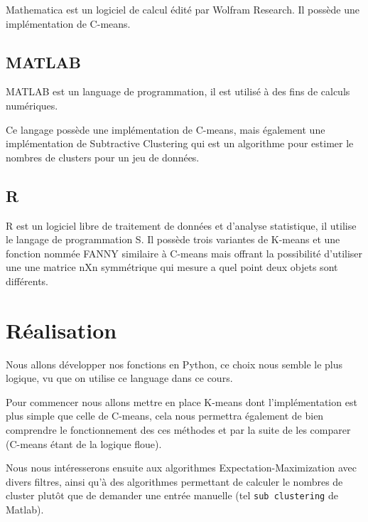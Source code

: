 \documentclass{article}
\begin{document}
  Mathematica est un logiciel de calcul édité par Wolfram Research. Il possède une implémentation de C-means.

  \subsection{MATLAB}

  MATLAB est un language de programmation, il est utilisé à des fins de calculs numériques.

  Ce langage possède une implémentation de C-means,
  mais également une implémentation de Subtractive Clustering
  qui est un algorithme pour estimer le nombres de clusters pour un jeu de données.


  \subsection{R}

  R est un logiciel libre de traitement de données et d'analyse statistique, il utilise le langage de programmation S.
  Il possède trois variantes de K-means et une fonction nommée FANNY similaire à C-means mais offrant la possibilité d'utiliser une
  une matrice nXn symmétrique qui mesure a quel point deux objets sont différents.


  \section{Réalisation}

  Nous allons développer nos fonctions en Python, ce choix nous semble le plus logique, vu que on utilise ce language dans ce cours.

  Pour commencer nous allons mettre en place K-means dont l'implémentation est plus simple que celle de C-means,
  cela nous permettra également de bien comprendre le fonctionnement des ces méthodes et par la suite de les comparer (C-means étant de la logique floue).

  Nous nous intéresserons ensuite aux algorithmes Expectation-Maximization avec divers filtres, ainsi qu'à des algorithmes permettant de calculer le nombres de cluster plutôt que de demander une entrée manuelle (tel \texttt{sub clustering} de Matlab).


\nocite{*}
\end{document}
